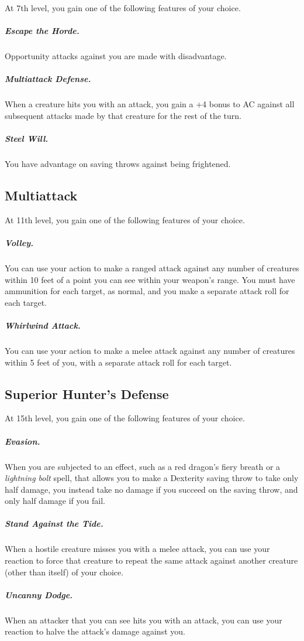 At 7th level, you gain one of the following features of your choice.

\subparagraph*{Escape the Horde.} Opportunity attacks against you are made with disadvantage.

\subparagraph*{Multiattack Defense.} When a creature hits you with an attack, you gain a +4 bonus to AC against all subsequent attacks made by that creature for the rest of the turn.

\subparagraph*{Steel Will.} You have advantage on saving throws against being frightened.

\subsection{Multiattack}

At 11th level, you gain one of the following features of your choice.

\subparagraph*{Volley.} You can use your action to make a ranged attack against any number of creatures within 10 feet of a point you can see within your weapon's range. You must have ammunition for each target, as normal, and you make a separate attack roll for each target.

\subparagraph*{Whirlwind Attack.} You can use your action to make a melee attack against any number of creatures within 5 feet of you, with a separate attack roll for each target.

\subsection{Superior Hunter's Defense}

At 15th level, you gain one of the following features of your choice.

\subparagraph*{Evasion.} When you are subjected to an effect, such as a red dragon's fiery breath or a \textit{lightning bolt} spell, that allows you to make a Dexterity saving throw to take only half damage, you instead take no damage if you succeed on the saving throw, and only half damage if you fail.

\subparagraph*{Stand Against the Tide.} When a hostile creature misses you with a melee attack, you can use your reaction to force that creature to repeat the same attack against another creature (other than itself) of your choice.

\subparagraph*{Uncanny Dodge.} When an attacker that you can see hits you with an attack, you can use your reaction to halve the attack's damage against you.
